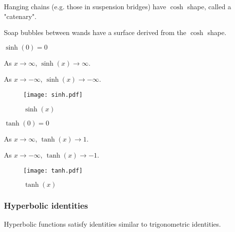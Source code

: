 Hanging chains (e.g. those in suspension bridges) have $\cosh$ shape, called a "catenary".

Soap bubbles between wands have a surface derived from the $\cosh$ shape.

$\sinh(0)=0$

As $x \to \infty$, $\sinh(x) \to \infty$.

As $x \to -\infty$, $\sinh(x) \to -\infty$.

\begin{figure}[H]
\centering
 \texttt{[image: sinh.pdf]}
\caption{$\sinh(x)$}
\end{figure}

$\tanh(0)=0$

As $x \to \infty$, $\tanh(x) \to 1$.

As $x \to -\infty$, $\tanh(x) \to -1$.

\begin{figure}[H]
\centering
 \texttt{[image: tanh.pdf]}
\caption{$\tanh(x)$}
\end{figure}

\subsubsection*{Hyperbolic identities}

Hyperbolic functions satisfy identities similar to trigonometric identities.

